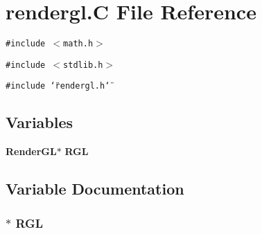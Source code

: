 \section{rendergl.C File Reference}
\label{rendergl_8C}
{\tt \#include $<$math.h$>$}\par
{\tt \#include $<$stdlib.h$>$}\par
{\tt \#include \char`\"{}rendergl.h\char`\"{}}\par
\subsection*{Variables}
\begin{CompactItemize}
\item 
{\bf Render\-GL}$\ast$ {\bf RGL}
\end{CompactItemize}


\subsection{Variable Documentation}
\subsubsection{ $\ast$ RGL}\label{rendergl_8C_a0}


